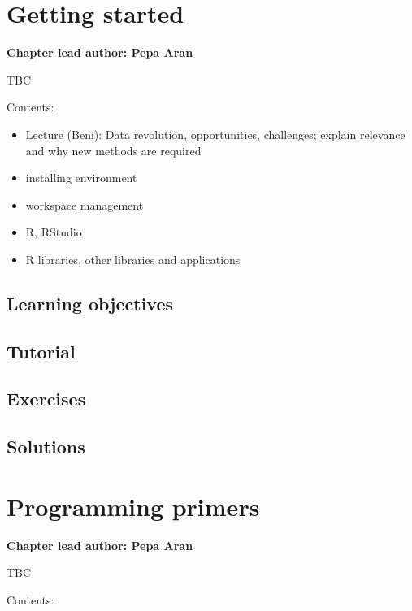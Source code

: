 \documentclass[
]{book}
\providecommand{\tightlist}{%
  \setlength{\itemsep}{0pt}\setlength{\parskip}{0pt}}
\begin{document}
\hypertarget{getting_started}{%
\chapter{Getting started}\label{getting_started}}

\textbf{Chapter lead author: Pepa Aran}

TBC

Contents:

\begin{itemize}
\tightlist
\item
  Lecture (Beni): Data revolution, opportunities, challenges; explain relevance and why new methods are required
\item
  installing environment
\item
  workspace management
\item
  R, RStudio
\item
  R libraries, other libraries and applications
\end{itemize}

\hypertarget{learning-objectives}{%
\section{Learning objectives}\label{learning-objectives}}

\hypertarget{tutorial}{%
\section{Tutorial}\label{tutorial}}

\hypertarget{exercises}{%
\section{Exercises}\label{exercises}}

\hypertarget{solutions}{%
\section{Solutions}\label{solutions}}

\hypertarget{programming_primers}{%
\chapter{Programming primers}\label{programming_primers}}

\textbf{Chapter lead author: Pepa Aran}

TBC

Contents:
\end{document}
